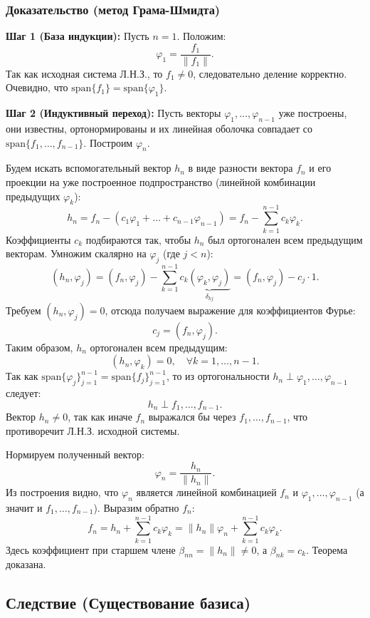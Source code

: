 \documentclass[12pt,a4paper,openany]{book}
\begin{document}
\subsubsection{Доказательство (метод Грама-Шмидта)}

\textbf{Шаг 1 (База индукции):}
Пусть $n=1$. Положим:
\[
\varphi_1 = \frac{f_1}{\|f_1\|}.
\]
Так как исходная система Л.Н.З., то $f_1 \neq 0$, следовательно деление корректно.
Очевидно, что $\text{span}\{f_1\} = \text{span}\{\varphi_1\}$.

\textbf{Шаг 2 (Индуктивный переход):}
Пусть векторы $\varphi_1, \dots, \varphi_{n-1}$ уже построены, они известны, ортонормированы и их линейная оболочка совпадает со $\text{span}\{f_1, \dots, f_{n-1}\}$.
Построим $\varphi_n$.

Будем искать вспомогательный вектор $h_n$ в виде разности вектора $f_n$ и его проекции на уже построенное подпространство (линейной комбинации предыдущих $\varphi_k$):
\[
h_n = f_n - (c_1 \varphi_1 + \dots + c_{n-1} \varphi_{n-1}) = f_n - \sum_{k=1}^{n-1} c_k \varphi_k.
\]
Коэффициенты $c_k$ подбираются так, чтобы $h_n$ был ортогонален всем предыдущим векторам. Умножим скалярно на $\varphi_j$ (где $j < n$):
\[
(h_n, \varphi_j) = (f_n, \varphi_j) - \sum_{k=1}^{n-1} c_k \underbrace{(\varphi_k, \varphi_j)}_{\delta_{kj}} = (f_n, \varphi_j) - c_j \cdot 1.
\]
Требуем $(h_n, \varphi_j) = 0$, отсюда получаем выражение для коэффициентов Фурье:
\[
c_j = (f_n, \varphi_j).
\]
Таким образом, $h_n$ ортогонален всем предыдущим:
\[
(h_n, \varphi_k) = 0, \quad \forall k=1, \dots, n-1.
\]
Так как $\text{span}\{\varphi_j\}_{j=1}^{n-1} = \text{span}\{f_j\}_{j=1}^{n-1}$, то из ортогональности $h_n \perp \varphi_1, \dots, \varphi_{n-1}$ следует:
\[
h_n \perp f_1, \dots, f_{n-1}.
\]
Вектор $h_n \neq 0$, так как иначе $f_n$ выражался бы через $f_1, \dots, f_{n-1}$, что противоречит Л.Н.З. исходной системы.

Нормируем полученный вектор:
\[
\varphi_n = \frac{h_n}{\|h_n\|}.
\]
Из построения видно, что $\varphi_n$ является линейной комбинацией $f_n$ и $\varphi_1, \dots, \varphi_{n-1}$ (а значит и $f_1, \dots, f_{n-1}$).
Выразим обратно $f_n$:
\[
f_n = h_n + \sum_{k=1}^{n-1} c_k \varphi_k = \|h_n\| \varphi_n + \sum_{k=1}^{n-1} c_k \varphi_k.
\]
Здесь коэффициент при старшем члене $\beta_{nn} = \|h_n\| \neq 0$, а $\beta_{nk} = c_k$.
Теорема доказана.

\subsection{Следствие (Существование базиса)}
\end{document}
